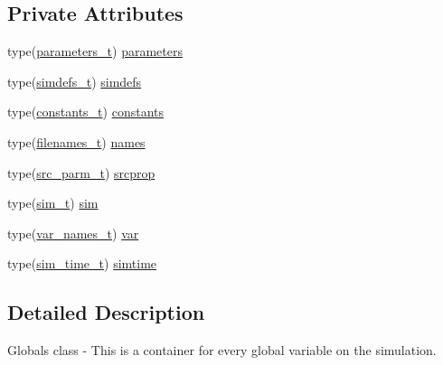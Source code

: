 \subsection*{Private Attributes}
\begin{DoxyCompactItemize}
\item 
type(\mbox{\hyperlink{structsimulationglobals__mod_1_1parameters__t}{parameters\+\_\+t}}) \mbox{\hyperlink{structsimulationglobals__mod_1_1globals__class_a6cf7f7fdf4c9f17c57bed07fea62be6a}{parameters}}
\item 
type(\mbox{\hyperlink{structsimulationglobals__mod_1_1simdefs__t}{simdefs\+\_\+t}}) \mbox{\hyperlink{structsimulationglobals__mod_1_1globals__class_aaf8f2208dd36873709a0cc4f8f5862b3}{simdefs}}
\item 
type(\mbox{\hyperlink{structsimulationglobals__mod_1_1constants__t}{constants\+\_\+t}}) \mbox{\hyperlink{structsimulationglobals__mod_1_1globals__class_ae5b1d2a8e662ad25456336893c91dd92}{constants}}
\item 
type(\mbox{\hyperlink{structsimulationglobals__mod_1_1filenames__t}{filenames\+\_\+t}}) \mbox{\hyperlink{structsimulationglobals__mod_1_1globals__class_a9bd11f32980290cab3bc86db344dc28a}{names}}
\item 
type(\mbox{\hyperlink{structsimulationglobals__mod_1_1src__parm__t}{src\+\_\+parm\+\_\+t}}) \mbox{\hyperlink{structsimulationglobals__mod_1_1globals__class_a3f6c36b781f6b2e6168362b764f54a68}{srcprop}}
\item 
type(\mbox{\hyperlink{structsimulationglobals__mod_1_1sim__t}{sim\+\_\+t}}) \mbox{\hyperlink{structsimulationglobals__mod_1_1globals__class_a4cfce0f16210a73a43b5b0420a77d521}{sim}}
\item 
type(\mbox{\hyperlink{structsimulationglobals__mod_1_1var__names__t}{var\+\_\+names\+\_\+t}}) \mbox{\hyperlink{structsimulationglobals__mod_1_1globals__class_a752c7c8dc10d072eda09d345a69dca1e}{var}}
\item 
type(\mbox{\hyperlink{structsimulationglobals__mod_1_1sim__time__t}{sim\+\_\+time\+\_\+t}}) \mbox{\hyperlink{structsimulationglobals__mod_1_1globals__class_a81dbc69f00c2af7f51f4b2fd962f9297}{simtime}}
\end{DoxyCompactItemize}


\subsection{Detailed Description}
Globals class -\/ This is a container for every global variable on the simulation. 

